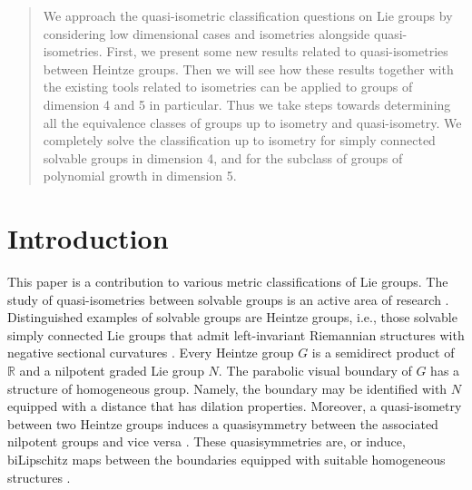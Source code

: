 \documentclass[a4paper,12pt]{amsart}
\theoremstyle{plain}
\theoremstyle{definition}
\theoremstyle{plain}
\theoremstyle{remark}
\begin{document}
\date{\today}

\begin{abstract}
We approach the quasi-isometric classification questions on Lie groups by considering low dimensional cases and isometries alongside quasi-isometries.
First, we present some new results related to quasi-isometries between Heintze groups. Then we will see how these results together with the existing tools related to isometries can be applied to groups of dimension 4 and 5 in particular. Thus we take steps towards determining all the equivalence classes of groups up to isometry and quasi-isometry.
We completely solve the classification up to isometry for simply connected solvable groups in dimension 4, and for the subclass of groups of polynomial growth in dimension 5.
\end{abstract}

 
 



\maketitle
\tableofcontents

\addtocounter{section}{-1}

\section{Introduction}   		

This paper is a contribution to various metric classifications of Lie groups. 
The study of quasi-isometries between solvable groups is an active area of research 
\cite{pansu,Shalom,  Sauer2006,Cornulier:qihlc,MR2925383,MR3034290,MR2594617,MR3180486,MR3335254,avain:CPS,avain:carrasco-orlicz,avain:Pal20}. 
Distinguished examples of solvable groups are Heintze groups, i.e., those solvable simply connected Lie groups that admit left-invariant Riemannian structures with negative sectional curvatures \cite{avain:He74}.
Every Heintze group \( G \) is a semidirect product of $\mathbb{R}$ and a nilpotent graded Lie group \(N\). 
The parabolic visual boundary of \( G \) has a structure of homogeneous group.
Namely, the boundary may be identified with \(N\) equipped with a distance that has dilation properties. Moreover, a quasi-isometry between two Heintze groups induces a quasisymmetry between the associated nilpotent groups and vice versa \cite{paulin_bord_hyp, Bonk-Schramm,Cornulier:qihlc}. These quasisymmetries are, or induce, biLipschitz maps between the boundaries equipped with suitable homogeneous structures \cite{avain:LD-Xie_fibers, avain:carrasco-orlicz}.
\end{document}
